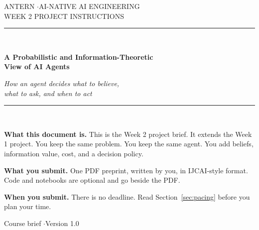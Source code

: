 \documentclass[11pt,a4paper]{article}
\begin{document}
\begin{titlepage}
\thispagestyle{empty}
\vspace*{2.2cm}
\begin{center}
{\footnotesize\sffamily\color{sbsoft}\MakeUppercase{ANTERN \quad$\cdot$\quad AI-Native AI Engineering}}\\[0.25cm]
{\footnotesize\sffamily\color{sbsoft}\MakeUppercase{Week 2 Project Instructions}}\\[1.4cm]

{\color{sbrule}\rule{0.72\textwidth}{0.4pt}}\\[0.9cm]

{\LARGE\bfseries A Probabilistic and Information-Theoretic\\[0.25cm] View of AI Agents\par}
\vspace{0.7cm}
{\large\itshape How an agent decides what to believe,\\[0.15cm] what to ask, and when to act\par}

\vspace{0.8cm}
{\color{sbrule}\rule{0.72\textwidth}{0.4pt}}\\[1.4cm]

\begin{minipage}{0.78\textwidth}
\small
\textbf{What this document is.} This is the Week 2 project brief. It extends the Week 1 project.
You keep the same problem. You keep the same agent. You add beliefs, information value,
cost, and a decision policy.

\vspace{0.4cm}

\textbf{What you submit.} One PDF preprint, written by you, in IJCAI-style format.
Code and notebooks are optional and go beside the PDF.

\vspace{0.4cm}

\textbf{When you submit.} There is no deadline. Read Section~\ref{sec:pacing} before you plan
your time.
\end{minipage}

\vfill
{\footnotesize\color{sbsoft}Course brief \quad$\cdot$\quad Version 1.0}
\end{center}
\end{titlepage}

\tableofcontents
\thispagestyle{fancy}
\newpage
\end{document}
